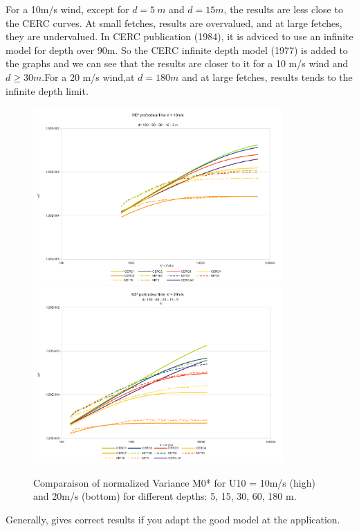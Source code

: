 For a 10m/s wind, except for $d = 5~m $ and $d = 15 m$, the results are less
close to the CERC curves. At small fetches, \tomawac results are overvalued, and
at large fetches, they are undervalued. In CERC publication (1984), it is
adviced to use an infinite model for depth over 90m. So the CERC infinite
depth model (1977) is added to the graphs and we can see that the results are
closer to it for a 10 m/s wind and $d \geq 30m$.For a 20 m/s wind,at $d = 180m$
and at large fetches, \tomawac results tends to the infinite depth limit.
\begin{figure}
\centering
\includegraphics[width=0.85\textwidth]{m0_test7v10.pdf}\\
\includegraphics[width=0.85\textwidth]{m0_test7v20.pdf}\\
\caption{Comparaison of normalized Variance M0* for U10 = 10m/s (high) and
  20m/s (bottom) for different depths: 5, 15, 30, 60, 180 m.}
\label{variancem0}
\end{figure}
Generally, \tomawac gives correct results if you adapt the good model at the
application.
